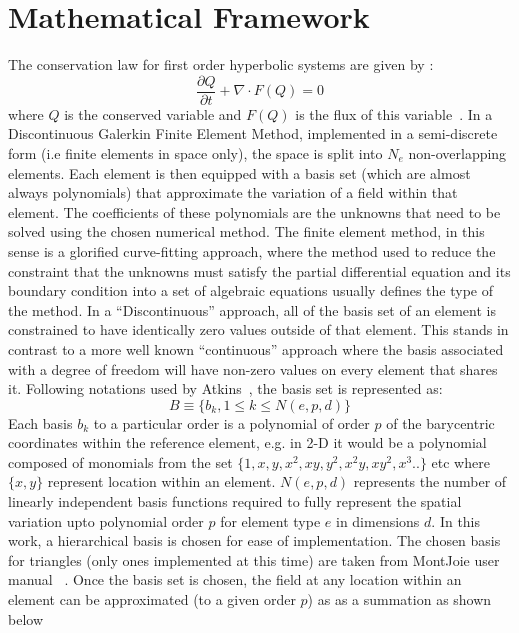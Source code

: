\documentclass[11pt]{article}
\begin{document}
\section{Mathematical Framework}
The conservation law for first order hyperbolic systems are given by :
\begin{equation}
  \frac{\partial Q}{\partial t} + \nabla \cdot F(Q) = 0
  \label{eq1}
\end{equation}
where $Q$ is the conserved variable and $F(Q)$ is the flux of this variable~\cite{wikipedia}. In a
Discontinuous Galerkin Finite Element Method, implemented in a semi-discrete form (i.e finite elements in space
only), the space is split into $N_e$ non-overlapping elements.
Each element is then equipped with a basis set (which are almost always polynomials) that
approximate the variation of a field within that element. The coefficients of these polynomials are the
unknowns that need to be solved using the chosen numerical method. The finite element method, in this sense
is a glorified curve-fitting approach, where the method used to reduce the constraint that the unknowns
must satisfy the partial differential equation and its boundary condition into a set of algebraic equations
usually defines the type of the method. In a ``Discontinuous'' approach, all of the basis set of an element is
constrained to have identically zero values outside of that element. This stands in contrast to a
more well known ``continuous'' approach where the basis associated with a degree of freedom will have
non-zero values on every element that shares it. Following notations used by
Atkins~\cite{atkins}, the basis set is represented as:
\begin{equation}
  B \equiv \{b_k, 1 \leq k \leq N(e,p,d)\}
\end{equation}
Each basis $b_k$ to a particular order is a polynomial of order $p$ of the barycentric
coordinates within the reference element, e.g. in 2-D it would be a polynomial composed of
monomials from the set $\{1,x,y,x^2,xy,y^2,x^2y,xy^2,x^3..\}$ etc where $\{x,y\}$ represent
location within an element. $N(e,p,d)$ represents
the number of linearly independent basis functions required to fully represent the spatial variation
upto polynomial order $p$ for element type $e$ in dimensions $d$.  In this work, a
hierarchical basis is chosen for ease of implementation. The chosen basis for
triangles (only ones implemented at this time) are taken from MontJoie user manual
~\cite{montjoie}. Once the basis set is chosen, the field at any location within an
element can be approximated (to a given order $p$) as  as a summation as shown below
\end{document}
